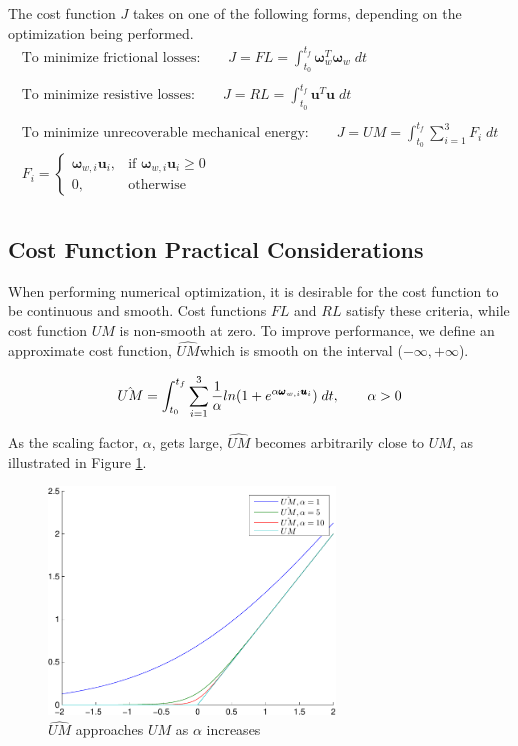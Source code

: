 \documentclass[letterpaper, paper,11pt]{AAS}		%
\begin{document}
The cost function $J$ takes on one of the following forms, depending on the optimization being performed.
\begin{align*}
\text{To minimize frictional losses:} \qquad
J = FL = \int_{t_{0}}^{t_{f}} \pmb{\omega}_{w}^{T}\pmb{\omega}_{w} \; dt \\
\\
\text{To minimize resistive losses:} \qquad
J = RL = \int_{t_{0}}^{t_{f}} \pmb{u}^{T}\pmb{u} \; dt \\
\\
\text{To minimize unrecoverable mechanical energy:}\qquad 
J=UM=\int_{t_{0}}^{t_{f}} \sum_{i = 1}^{3}F_{i} \; dt \\
	F_{i}  = \begin{cases}
    \pmb{\omega}_{w,i}\pmb{u}_{i},& \text{if } \pmb{\omega}_{w,i}\pmb{u}_{i}\geq 0\\
    0,              & \text{otherwise}
	\end{cases} \\
\end{align*}




\subsection{Cost Function Practical Considerations}
When performing numerical optimization, it is desirable for the cost function to be continuous and smooth. Cost functions $FL$ and $RL$ satisfy these criteria, while cost function $UM$ is non-smooth at zero. To improve performance, we define an approximate cost function, $\hat{UM}$which is smooth on the interval ($-\infty , +\infty$).

\begin{equation}
\hat{UM} = \int_{t_{0}}^{t_{f}} \sum_{i = 1}^{3}\frac{1}{\alpha}ln(1+e^{\alpha \pmb{\omega}_{w,i} \pmb{u}_{i}}) \; dt, \qquad \alpha > 0 \\
\end{equation}

As the scaling factor, $\alpha$, gets large, $\hat{UM}$ becomes arbitrarily close to $UM$, as illustrated in Figure \ref{f:UMhat}.

\begin{figure}[H]%
\centering
 \includegraphics[width = 3in]{cfapprox}
 \caption{$\hat{UM}$ approaches $UM$ as $\alpha$ increases}
 \label{f:UMhat}
\end{figure}
\end{document}
